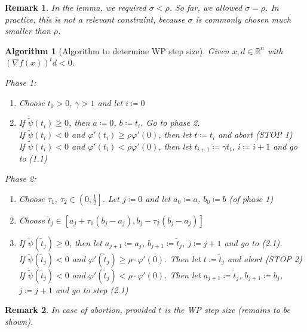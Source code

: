 \documentclass[a4paper]{article}
\numberwithin{lecref}{subsection}
\newtheorem*{Remark}{Remark}
\newtheorem*{Algorithm}{Algorithm}
\begin{document}
\begin{Remark}
	In the lemma, we required $\sigma < \rho$. So far, we allowed $\sigma = \rho$.
	In practice, this is not a relevant constraint, because $\sigma$ is commonly chosen much smaller than $\rho$.
\end{Remark}

\begin{Algorithm}[Algorithm to determine WP step size]
	Given $x, d \in \mathbb R^n$ with $(\nabla f(x))^t d < 0$.

	\emph{Phase 1}:
	\begin{enumerate}
		\item[1.0.] Choose $t_0 > 0$, $\gamma > 1$ and let $i \coloneqq 0$
		\item[1.1.]
			If $\tilde \psi(t_i) \geq 0$, then $a \coloneqq 0$, $b \coloneqq t_i$. Go to phase 2. \\
			If $\tilde \psi(t_i) < 0$ and $\varphi'(t_i) \geq \rho \varphi'(0)$, then let $t \coloneqq t_i$ and abort (STOP 1) \\
			If $\tilde \psi(t_i) < 0$ and $\varphi'(t_i) < \rho \varphi'(0)$, then let $t_{i+1} \coloneqq \gamma t_i$, $i \coloneqq i + 1$ and go to (1.1)
	\end{enumerate}

	\emph{Phase 2}:
	\begin{enumerate}
		\item[2.0.] Choose $\tau_1$, $\tau_2 \in \left(0, \frac12\right]$. Let $j \coloneqq 0$ and let $a_0 \coloneqq a$, $b_0 \coloneqq b$ (of phase 1)
		\item[2.1.] Choose $\tilde t_j \in [a_j + \tau_1 (b_j - a_j), b_j - \tau_2(b_j - a_j)]$
		\item[2.2.] If $\tilde \psi(\tilde t_j) \geq 0$, then let $a_{j+1} \coloneqq a_j$, $b_{j+1} \coloneqq \tilde t_j$, $j \coloneqq j+1$ and go to (2.1). \\
		If $\tilde\psi(\tilde t_j) < 0$ and $\varphi'(\tilde t_j) \geq \rho \cdot \varphi'(0)$. Then let $t \coloneqq \tilde t_j$ and abort (STOP 2) \\
		If $\tilde\psi(\tilde t_j) < 0$ and $\varphi'(\tilde t_j) < \rho \cdot \varphi'(0)$. Then let $a_{j+1} \coloneqq \tilde t_j$, $b_{j+1} \coloneqq b_j$, $j \coloneqq j+1$ and go to step (2.1)
	\end{enumerate}
\end{Algorithm}

\begin{Remark}
	In case of abortion, provided $t$ is the WP step size (remains to be shown).
\end{Remark}
\end{document}
